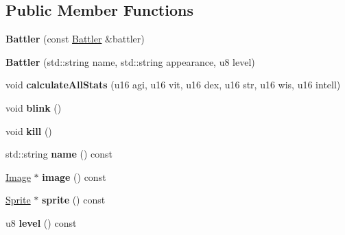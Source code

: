 \subsection*{Public Member Functions}
\begin{DoxyCompactItemize}
\item 
\hypertarget{classBattler_a2dd61dc2fb380da5ce4eb94beae870a4}{{\bfseries Battler} (const \hyperlink{classBattler}{Battler} \&battler)}\label{classBattler_a2dd61dc2fb380da5ce4eb94beae870a4}

\item 
\hypertarget{classBattler_abc682178f335bb6e93a50ae2c0cc14d3}{{\bfseries Battler} (std\-::string name, std\-::string appearance, u8 level)}\label{classBattler_abc682178f335bb6e93a50ae2c0cc14d3}

\item 
\hypertarget{classBattler_aa2135603d74f503b7ea0ba813a3e5751}{void {\bfseries calculate\-All\-Stats} (u16 agi, u16 vit, u16 dex, u16 str, u16 wis, u16 intell)}\label{classBattler_aa2135603d74f503b7ea0ba813a3e5751}

\item 
\hypertarget{classBattler_a1111cc648c06d73b2f51e9f2d036eabc}{void {\bfseries blink} ()}\label{classBattler_a1111cc648c06d73b2f51e9f2d036eabc}

\item 
\hypertarget{classBattler_a13256d68a87e588be4b10438645cffb8}{void {\bfseries kill} ()}\label{classBattler_a13256d68a87e588be4b10438645cffb8}

\item 
\hypertarget{classBattler_a65d0ef219ba0738c750088e7318ad4f8}{std\-::string {\bfseries name} () const }\label{classBattler_a65d0ef219ba0738c750088e7318ad4f8}

\item 
\hypertarget{classBattler_a8c78ffa9f03434f6381fd14bee851c21}{\hyperlink{classImage}{Image} $\ast$ {\bfseries image} () const }\label{classBattler_a8c78ffa9f03434f6381fd14bee851c21}

\item 
\hypertarget{classBattler_a306b9d4a2a15ed27d49266fef3e50e72}{\hyperlink{classSprite}{Sprite} $\ast$ {\bfseries sprite} () const }\label{classBattler_a306b9d4a2a15ed27d49266fef3e50e72}

\item 
\hypertarget{classBattler_aec1f9dc85e5016dffd2e22e277fd4cf4}{u8 {\bfseries level} () const }\label{classBattler_aec1f9dc85e5016dffd2e22e277fd4cf4}


\end{DoxyCompactItemize}
